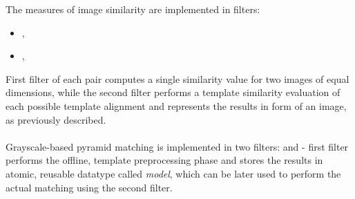 \begin{refImpl}
The measures of image similarity are implemented in \studio filters:
\begin{itemize}
	\item {}, 
	\item {}, 
\end{itemize}
First filter of each pair computes a single similarity value for two images of equal dimensions, while the second filter performs a template similarity evaluation of each possible template alignment and represents the results in form of an image, as previously described.

\paragraph*{}
Grayscale-based pyramid matching is implemented in two \studio filters:  and  - first filter performs the offline, template preprocessing phase and stores the results in atomic, reusable datatype called \textit{model}, which can be later used to perform the actual matching using the second filter.
\end{refImpl}